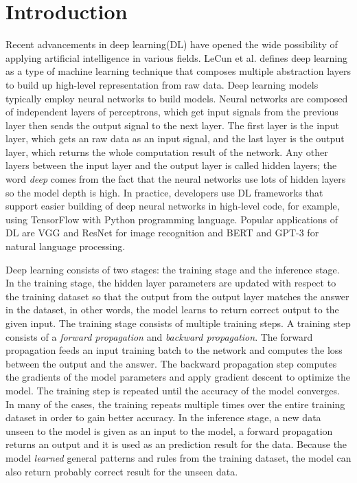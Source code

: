 \section{Introduction}\label{sec:intro}

Recent advancements in deep learning(DL) have opened the wide possibility of
applying artificial intelligence in various fields.
LeCun et al.\cite{LeCun2015} defines deep learning as a
type of machine learning technique that composes multiple
abstraction layers to build up high-level representation from raw data. 
Deep learning models typically employ neural networks to build models.
Neural networks are composed of independent layers of perceptrons,
which get input signals from the previous layer then sends the
output signal to the next layer.
The first layer is the input layer, which gets an raw data as an input signal,
and the last layer is the output layer, which returns the
whole computation result of the network.
Any other layers between the input layer and the output layer is 
called hidden layers; the word \textit{deep} comes from the fact that
the neural networks use lots of hidden layers so the model depth is high.
In practice, developers use DL frameworks that support easier building of
deep neural networks in high-level code, for example, using
TensorFlow\cite{tensorflow} with Python programming language\cite{pythonref}.
Popular applications of DL are
VGG\cite{vggnet2014} and ResNet\cite{resnet2015} for image recognition 
and BERT\cite{bert2018} and GPT-3\cite{gpt32020} for natural language processing.

Deep learning consists of two stages: the training stage and the inference stage.
In the training stage, the hidden layer parameters are updated
with respect to the training dataset so that the output from the output layer
matches the answer in the dataset, in other words, the model learns
to return correct output to the given input. 
The training stage consists of multiple training steps.
A training step consists of a \textit{forward propagation} and
\textit{backward propagation}.
The forward propagation feeds an input training batch to the
network and computes the loss between the output and the answer.
The backward propagation step computes the gradients of the model parameters
and apply gradient descent to optimize the model.
The training step is repeated until the accuracy of the model converges.
In many of the cases, the training repeats multiple times over the entire 
training dataset in order to gain better accuracy.  
In the inference stage, a new data unseen to the model
is given as an input to the model, a forward propagation returns an output
and it is used as an prediction result for the data.
Because the model \textit{learned} general patterns and rules from the training
dataset, the model can also return probably correct result for the
unseen data.

